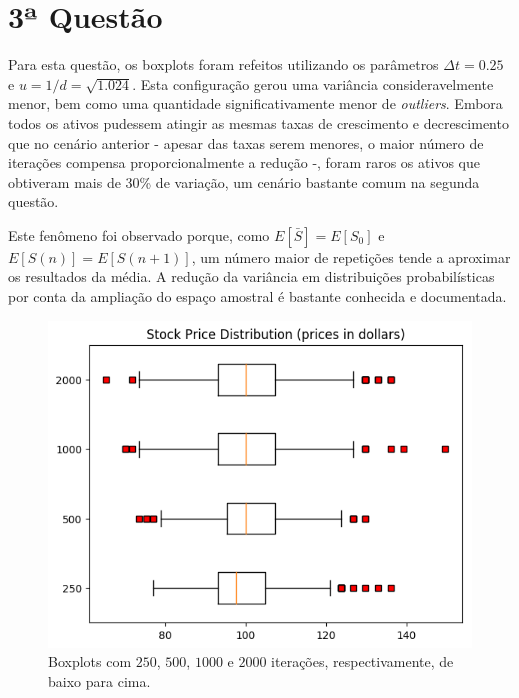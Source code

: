\documentclass{article}
\begin{document}

\section*{3ª Questão}

Para esta questão, os boxplots foram refeitos utilizando os parâmetros $\Delta t = 0.25$ e $u = 1/d = \sqrt{1.024}$.
Esta configuração gerou uma variância consideravelmente menor, bem como uma quantidade significativamente menor de \emph{outliers}.
Embora todos os ativos pudessem atingir as mesmas taxas de crescimento e decrescimento que no cenário anterior - apesar das taxas serem menores, o maior número de iterações compensa proporcionalmente a redução -, foram raros os ativos que obtiveram mais de 30\% de variação, um cenário bastante comum na segunda questão.

Este fenômeno foi observado porque, como $E[\bar{S}] = E[S_{0}]$ e $E[S(n)] = E[S(n+1)]$, um número maior de repetições tende a aproximar os resultados da média.
A redução da variância em distribuições probabilísticas por conta da ampliação do espaço amostral é bastante conhecida e documentada. 

\begin{figure}[H]
	\includegraphics[width=\linewidth]{fig3_250.png}
	\centering
	
	\caption{Boxplots com $250$, $500$, $1000$ e $2000$ iterações, respectivamente, de baixo para cima.}
	\label{}
\end{figure}
\end{document}
